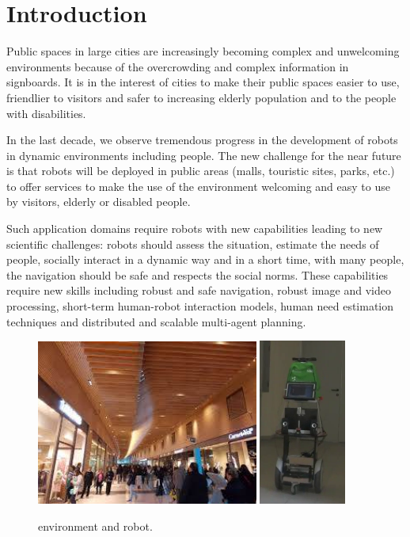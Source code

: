 \section{Introduction}
\label{sec:intro}

Public spaces in large cities are increasingly becoming complex and unwelcoming environments because of the overcrowding and complex information in signboards. It is in the interest of cities to make their public spaces easier to use, friendlier to visitors and safer to increasing elderly population and to the people with disabilities.

In the last decade, we observe tremendous progress in the development of robots in dynamic environments %
including people. The new challenge for the near future is that robots will be deployed in public areas (malls, touristic sites, parks, etc.) to offer services to make the use of the environment welcoming and easy to use by visitors, elderly or disabled people. 

Such application domains require robots with new capabilities leading to new scientific challenges: robots should assess the situation, estimate the needs of people, socially interact in a dynamic way and in a short time, with many people, the navigation should be safe and respects the social norms. These capabilities require new skills including robust and safe navigation, robust image and video processing, short-term human-robot interaction models, human need estimation techniques and distributed and scalable multi-agent planning.

\begin{figure}[t!]
\centering
\includegraphics[width=0.65\textwidth]{fig/rivedelorne}
\hspace{0.8cm}
\includegraphics[width=0.255\textwidth]{fig/diago1}
\caption{\coaches environment and robot.}
\label{fig:env}
\end{figure}

